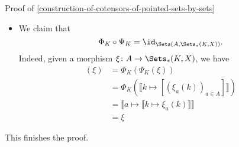 \begin{Proof}{Proof of \cref{construction-of-cotensors-of-pointed-sets-by-sets}}
\begin{itemize}
\begin{enumerate}
            \end{enumerate}
            In both cases, we have $[\Psi_{K}\circ\Phi_{K}](\xi)=\xi$, and thus we are done.
        \item{}We claim that
            \[
                \Phi_{K}\circ\Psi_{K}%
                =%
                \id_{\Sets(A,\Sets_{*}(K,X))}.%
            \]%
            Indeed, given a morphism $\xi\colon A\to\Sets_{*}(K,X)$, we have
            \begin{align*}
                [\Phi_{K}\circ\Psi_{K}](\xi) &= \Phi_{K}(\Psi_{K}(\xi))\\%
                                             &= \Phi_{K}(\llbracket k\mapsto[(\xi_{a}(k))_{a\in A}]\rrbracket)\\%
                                             &= \llbracket a\mapsto\llbracket k\mapsto\xi_{a}(k)\rrbracket\rrbracket\\%
                                             &= \xi%
            \end{align*}
    \end{itemize}
    This finishes the proof.
\end{Proof}

